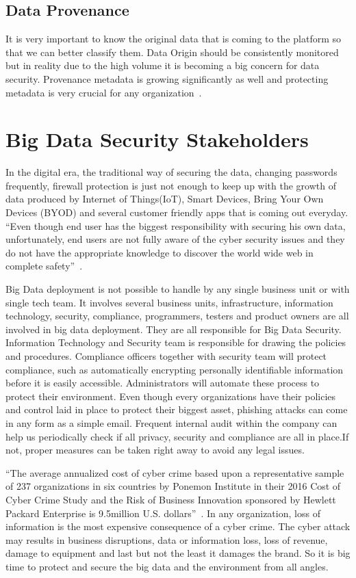 \subsection{Data Provenance}
It is very important to know the original data that is coming
to the platform so that we can better classify them. Data
Origin should be consistently monitored but in reality 
due to the high volume it is becoming a big concern for 
data security. Provenance metadata is growing significantly 
as well and protecting metadata is very crucial 
for any organization~\cite{dataconomy}.

\section{Big Data Security Stakeholders}
In the digital era, the traditional way of securing the data,
changing passwords frequently, firewall protection is just not
enough to keep up with the growth of data produced by
Internet of Things(IoT), Smart Devices, Bring Your Own
Devices (BYOD) and several customer friendly apps that
is coming out everyday. ``Even though end user has the
biggest responsibility with securing his own data, unfortunately, 
end users are not fully aware of the cyber security issues 
and they do not have the appropriate knowledge to discover 
the world wide web in complete safety''~\cite{realdolmen}.

Big Data deployment is not possible to handle by any single 
business unit or with single tech team. It involves several
business units, infrastructure, information technology, 
security, compliance, programmers, testers and product
owners are all involved in big data deployment. They are 
all responsible for Big Data Security. Information Technology
and Security team is responsible for drawing the policies and 
procedures. Compliance officers together with security team
will protect compliance, such as automatically encrypting
personally identifiable information before it is easily 
accessible. Administrators will automate these process to
protect their environment. Even though every organizations
have their policies and control laid in place to protect their
biggest asset, phishing attacks can come in any form as a simple
email. Frequent internal audit within the company can help us
periodically check if all privacy, security and compliance
are all in place.If not, proper measures can be taken right
away to avoid any legal issues.

``The average annualized cost of cyber crime based upon a
representative sample of 237 organizations in six countries
by Ponemon Institute in their 2016 Cost of Cyber Crime Study
and the Risk of Business Innovation sponsored by Hewlett 
Packard Enterprise is 9.5million U.S. dollars''~\cite{ponemon}. 
In any organization, loss of information is the most expensive
consequence of a cyber crime. The cyber attack may results in
business disruptions, data or information loss, loss of revenue,
damage to equipment and last but not the least it damages 
the brand. So it is big time to protect and secure the big 
data and the environment from all angles.

